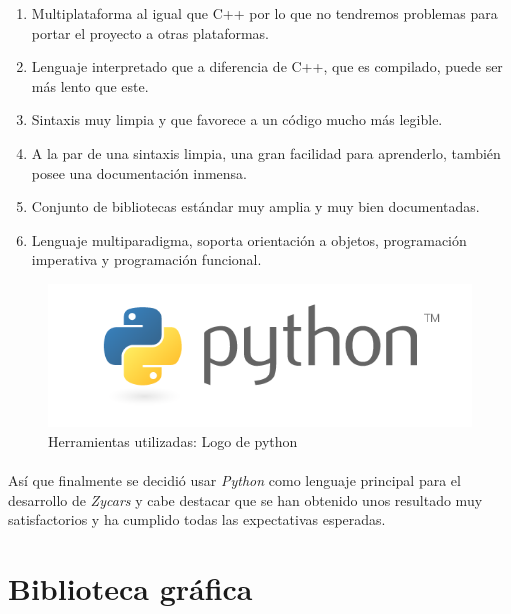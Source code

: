 \begin{enumerate}
    \item Multiplataforma al igual que C++ por lo que no tendremos problemas para portar el proyecto a otras plataformas.
    
    \item Lenguaje interpretado que a diferencia de C++, que es compilado, puede ser más lento que este.
    
    \item Sintaxis muy limpia y que favorece a un código mucho más legible.
    
    \item A la par de una sintaxis limpia, una gran facilidad para aprenderlo, también posee una documentación inmensa.
    
    \item Conjunto de bibliotecas estándar muy amplia y muy bien documentadas.
    
    \item Lenguaje multiparadigma, soporta orientación a objetos, programación imperativa y programación funcional.
\end{enumerate}

\begin{figure}[H]
  \label{logo_python}
  \begin{center}
    \includegraphics[scale=0.4]{imagenes/logo_python.png}
  \end{center}
  \caption{Herramientas utilizadas: Logo de python}
\end{figure}

\paragraph{}
Así que finalmente se decidió usar \emph{Python} como lenguaje principal para el desarrollo de \emph{Zycars} y cabe destacar que se han obtenido
unos resultado muy satisfactorios y ha cumplido todas las expectativas esperadas.

\section{Biblioteca gráfica}

